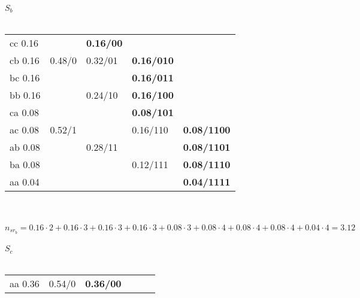 \documentclass[12pt]{article}
\begin{document}
\begin{enumerate}
\begin{equation*}
\end{equation*}
\\
$S_b$
\\
\\
\begin{tabular}{|l|l|l|ll}
\cline{1-3}
cc 0.16 &        & \textbf{0.16/00} &                                        &                                         \\ \cline{1-1} \cline{3-4}
cb 0.16 & 0.48/0 & 0.32/01          & \multicolumn{1}{l|}{\textbf{0.16/010}} &                                         \\ \cline{1-1} \cline{4-4}
bc 0.16 &        &                  & \multicolumn{1}{l|}{\textbf{0.16/011}} &                                         \\ \cline{1-4}
bb 0.16 &        & 0.24/10          & \multicolumn{1}{l|}{\textbf{0.16/100}} &                                         \\ \cline{1-1} \cline{4-4}
ca 0.08 &        &                  & \multicolumn{1}{l|}{\textbf{0.08/101}} &                                         \\ \cline{1-1} \cline{3-5} 
ac 0.08 & 0.52/1 &                  & \multicolumn{1}{l|}{0.16/110}          & \multicolumn{1}{l|}{\textbf{0.08/1100}} \\ \cline{1-1} \cline{5-5} 
ab 0.08 &        & 0.28/11          & \multicolumn{1}{l|}{}                  & \multicolumn{1}{l|}{\textbf{0.08/1101}} \\ \cline{1-1} \cline{4-5} 
ba 0.08 &        &                  & \multicolumn{1}{l|}{0.12/111}          & \multicolumn{1}{l|}{\textbf{0.08/1110}} \\ \cline{1-1} \cline{5-5} 
aa 0.04 &        &                  & \multicolumn{1}{l|}{}                  & \multicolumn{1}{l|}{\textbf{0.04/1111}} \\ \hline
\end{tabular}
\\
\\
\begin{equation*}
    n_{sr_{b}} = 0.16 \cdot 2 + 0.16 \cdot 3 + 0.16 \cdot 3 + 0.16 \cdot 3 + 0.08 \cdot 3 + 0.08 \cdot 4 + 0.08 \cdot 4 + 0.08 \cdot 4 + 0.04 \cdot 4 = 3.12
\end{equation*}	
\\
$S_c$
\\
\\
\begin{tabular}{|l|l|l|lll}
\cline{1-3}
aa 0.36 & 0.54/0 & \textbf{0.36/00} &                                        &                                         &                                          \\ \cline{1-1} \cline{3-3}

\end{tabular}
\end{enumerate}
\end{document}
